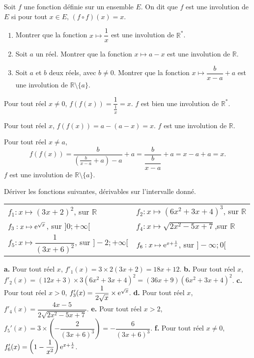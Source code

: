 \documentclass[11pt,fleqn, openany]{book} %
\begin{document}
\begin{exercise}[topic=der03]Soit $f$ une fonction définie sur un ensemble $E$. On dit que $f$ est une involution de $E$ si pour tout $x\in E$, $(f \circ f)(x)=x$.
\begin{enumerate}
\item Montrer que la fonction $x\mapsto \dfrac{1}{x}$ est une involution de $\mathbb{R}^*$.
\item Soit $a$ un réel. Montrer que la fonction $x\mapsto a-x$ est une involution de $\mathbb{R}$.
\item Soit $a$ et $b$ deux réels, avec $b\neq 0$. Montrer que la fonction $x\mapsto \dfrac{b}{x-a}+a$ est une involution de $\mathbb{R}\setminus \{a\}$.
\end{enumerate}\end{exercise}

\begin{solution}
Pour tout réel $x\neq 0$, $f(f(x))=\dfrac{1}{\frac{1}{x}}=x$. $f$ est bien une involution de $\mathbb{R}^*$.

Pour tout réel $x$, $f(f(x))=a-(a-x)=x$. $f$ est une involution de $\mathbb{R}$.

Pour tout réel $x\neq a$,
\[f(f(x))=\dfrac{b}{\left(\frac{b}{x-a}+a\right)-a}+a=\dfrac{b}{\dfrac{b}{x-a}}+a=x-a+a=x.\]
$f$ est une involution de $\mathbb{R}\setminus \{a\}$.\end{solution}




\begin{exercise}[topic=der03]Dériver les fonctions suivantes, dérivables sur l'intervalle donné.

\renewcommand{\arraystretch}{2}
\begin{tabularx}{\linewidth}{XX}
 $f_1 : x \mapsto (3x+2)^2$, sur $\mathbb{R}$ &
 $f_2 : x \mapsto (6x^2+3x+4)^3$,  sur $\mathbb{R}$ \\
  $f_3 : x \mapsto \mathrm{e}^{\sqrt{x}}$,  sur $]0;+\infty[$ &
$f_4 : x \mapsto \sqrt{2x^2-5x+7}$,sur $\mathbb{R}$ \\
  $f_5 : x \mapsto \dfrac{1}{(3x+6)^2}$, sur $]-2;+\infty[$ &
$f_6 : x \mapsto \mathrm{e}^{x+\frac{1}{x}}$,  sur $]-\infty;0[$ 
\end{tabularx}\end{exercise}

\begin{solution}\textbf{a.} Pour tout réel $x$, $f'_1(x)=3\times 2 (3x+2)=18x+12$.
\vskip5pt
\textbf{b.} Pour tout réel $x$, $f'_2(x)=(12x+3)\times 3(6x^2+3x+4)^2=(36x+9)(6x^2+3x+4)^2$.
\vskip5pt
\textbf{c.} Pour tout réel $x>0$, $f'_3(x)=\dfrac{1}{2\sqrt{x}}\times \mathrm{e}^{\sqrt{x}}$.
\vskip5pt
\textbf{d.} Pour tout réel $x$, $f'_4(x)=\dfrac{4x-5}{2\sqrt{2x^2-5x+7}}$.
\vskip5pt
\textbf{e.} Pour tout réel $x>2$, $f_5'(x)=3 \times \left(-\dfrac{2}{(3x+6)^3}\right)=-\dfrac{6}{(3x+6)^3}$.
\vskip5pt
\textbf{f.} Pour tout réel $x\neq 0$, $f'_6(x)=\left(1-\dfrac{1}{x^2}\right)\mathrm{e}^{x+\frac{1}{x}}$.\end{solution}
\end{document}
